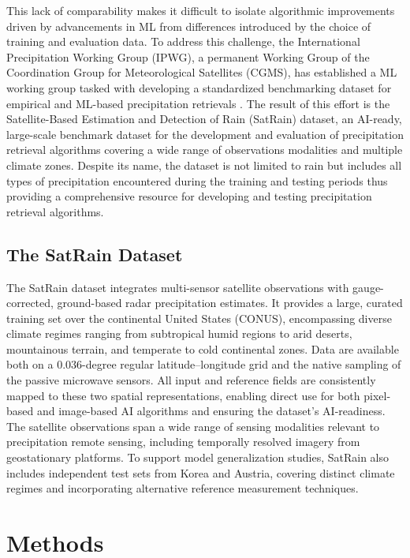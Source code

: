 \documentclass[11pt]{article}
\begin{document}
This lack of comparability makes it difficult to isolate algorithmic
improvements driven by advancements in ML from differences
introduced by the choice of training and evaluation data. To address this
challenge, the International Precipitation Working Group (IPWG), a permanent
Working Group of the Coordination Group for Meteorological Satellites (CGMS),
has established a ML working group tasked with developing a
standardized benchmarking dataset for empirical and ML-based
precipitation retrievals \citep{Kubota2025IPWG}. The result of this effort is
the Satellite-Based Estimation and Detection of Rain (SatRain) dataset, an
AI-ready, large-scale benchmark dataset for the development and evaluation of
precipitation retrieval algorithms covering a wide range of observations
modalities and multiple climate zones. Despite its name, the dataset is not
limited to rain but includes all types of precipitation encountered during the
training and testing periods thus providing a comprehensive resource for
developing and testing precipitation retrieval algorithms.


\subsection{The SatRain Dataset}

The SatRain dataset integrates multi-sensor satellite observations with
gauge-corrected, ground-based radar precipitation estimates. It provides a
large, curated training set over the continental United States (CONUS),
encompassing diverse climate regimes ranging from subtropical humid regions to
arid deserts, mountainous terrain, and temperate to cold continental zones. Data
are available both on a 0.036-degree regular latitude–longitude grid and the native
sampling of the passive microwave sensors. All input and reference fields are
consistently mapped to these two spatial representations, enabling direct use
for both pixel-based and image-based AI algorithms and ensuring the dataset’s
AI-readiness. The satellite observations span a wide range of sensing modalities
relevant to precipitation remote sensing, including temporally resolved imagery
from geostationary platforms. To support model generalization studies, SatRain
also includes independent test sets from Korea and Austria, covering distinct
climate regimes and incorporating alternative reference measurement techniques.

\section{Methods}
\end{document}
